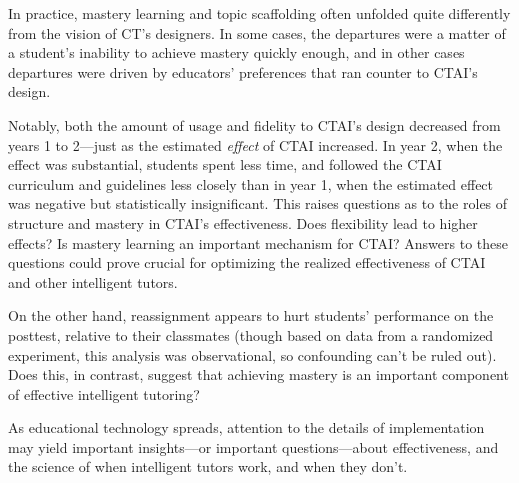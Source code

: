 \documentclass[12pt]{article}\usepackage[]{graphicx}\usepackage[]{color}
\begin{document}
In practice, mastery learning and topic scaffolding often unfolded
quite differently from the vision of CT's designers.
In some cases, the departures were a matter of a student's inability
to achieve mastery quickly enough, and in other cases departures were
driven by educators' preferences that ran counter to CTAI's design.

Notably, both the amount of usage and fidelity to CTAI's design
decreased from years 1 to 2---just as the estimated \emph{effect} of
CTAI increased.
In year 2, when the effect was substantial, students spent less time,
and followed the CTAI curriculum and guidelines less closely than in
year 1, when the estimated effect was negative but statistically
insignificant.
This raises questions as to the roles of structure and mastery in
CTAI's effectiveness.
Does flexibility lead to higher effects? Is mastery learning an
important mechanism for CTAI?
Answers to these questions could prove crucial for optimizing the
realized effectiveness of CTAI and other intelligent tutors.

On the other hand, reassignment appears to hurt students' performance
on the posttest, relative to their classmates (though based on data
from a randomized experiment, this analysis was observational, so
confounding can't be ruled out).
Does this, in contrast, suggest that achieving mastery is an important
component of effective intelligent tutoring?

As educational technology spreads, attention to the details of
implementation may yield important insights---or important
questions---about effectiveness, and the science of when
intelligent tutors work, and when they don't.



\end{document}
